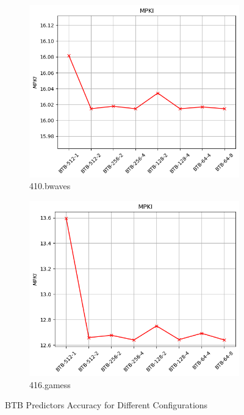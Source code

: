 \documentclass{article}
\begin{document}
\begin{figure}[H]
    \vspace{0.5cm} %

    \begin{subfigure}[b]{0.45\textwidth}
        \includegraphics[width=\textwidth]{figures/5_4/410.bwaves.cslab_branch_preds_ref.out.png}
        \caption{410.bwaves}
        \label{fig:plot51}
    \end{subfigure}
    \hfill
    \begin{subfigure}[b]{0.45\textwidth}
        \includegraphics[width=\textwidth]{figures/5_4/416.gamess.cslab_branch_preds_ref.out.png}
        \caption{416.gamess}
        \label{fig:plot52}
    \end{subfigure}

    \vspace{0.5cm} %

    \caption{BTB Predictors Accuracy for Different Configurations}
    \label{fig:btb}
\end{figure}
\end{document}
